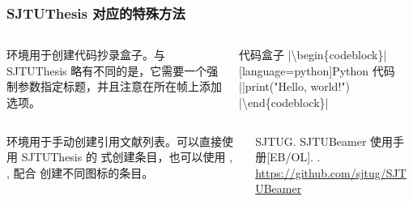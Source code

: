 \begin{frame}[fragile]
  \frametitle{SJTUThesis 对应的特殊方法}
  \begin{columns}
    \begin{column}{0.55\textwidth}
       环境用于创建代码抄录盒子。与 SJTUThesis 略有不同的是，它需要一个强制参数指定标题，并且注意在所在帧上添加  选项。
    \end{column}
    \begin{column}{0.45\textwidth}
      \begin{codeblock}{代码盒子}
|\textbackslash{}begin\{codeblock\}|[language=python]{Python 代码}
||print("Hello, world!")
|\textbackslash{}end\{codeblock\}|
      \end{codeblock}
    \end{column}
  \end{columns}


  \begin{columns}
    \begin{column}{0.55\textwidth}
       环境用于手动创建引用文献列表。可以直接使用 SJTUThesis 的  式创建条目，也可以使用 , ,  配合  创建不同图标的条目。
    \end{column}
    \begin{column}{0.45\textwidth}
      \begin{bibliolist}{00}
        \onlineitem SJTUG.
        \newblock SJTUBeamer 使用手册[EB/OL].
        . \url{https://github.com/sjtug/SJTUBeamer}
      \end{bibliolist}
    \end{column}
  \end{columns}


\end{frame}

